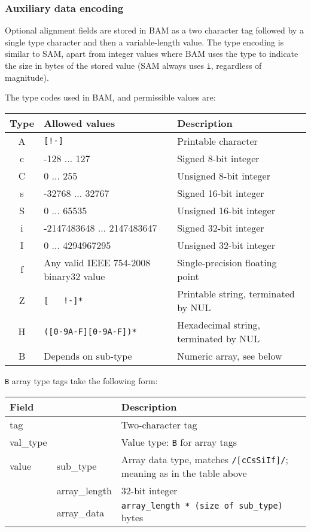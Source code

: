 \documentclass[10pt]{article}
\begin{document}
\subsubsection{Auxiliary data encoding}\label{sec:aux-type-codes}
Optional alignment fields are stored in BAM as a two character tag followed by a single type character and then a variable-length value.
The type encoding is similar to SAM, apart from integer values where BAM uses the type to indicate the size in bytes of the stored value (SAM always uses {\tt i}, regardless of magnitude).

The type codes used in BAM, and permissible values are:

\begin{table}[ht]
\centering
\begin{tabular}{|c|l|l|}
\hline
{\bf Type} & {\bf Allowed values} & {\bf Description} \\
\hline
A & {\tt [!-\char126]} & Printable character \\
c & -128 ... 127 & Signed 8-bit integer \\
C & 0 ... 255 & Unsigned 8-bit integer \\
s & -32768 ... 32767 & Signed 16-bit integer \\
S & 0 ... 65535 & Unsigned 16-bit integer \\
i & -2147483648 ... 2147483647 & Signed 32-bit integer \\
I & 0 ... 4294967295 & Unsigned 32-bit integer \\
f & Any valid IEEE 754-2008 binary32 value & Single-precision floating point \\
Z & {\tt [\,\,\,!-\char126]*} & Printable string, terminated by NUL \\
H & {\tt ([0-9A-F][0-9A-F])*} & Hexadecimal string, terminated by NUL \\
B & Depends on sub-type & Numeric array, see below \\
\hline
\end{tabular}
\end{table}

{\tt B} array type tags take the following form:

\begin{table}[ht]
\centering
\begin{tabular}{|ll|l|}
\hline
{\bf Field} & & {\bf Description} \\
\hline
tag & & Two-character tag \\
\hline
{val\_type} & & Value type: {\tt B} for array tags \\
\hline
value & \multicolumn{1}{|l|}{sub\_type} & Array data type, matches {\tt /\char94[cCsSiIf]/}; meaning as in the table above \\\cline{2-3}
 & \multicolumn{1}{|l|}{array\_length} & 32-bit integer \\\cline{2-3}
 & \multicolumn{1}{|l|}{array\_data} & {\tt array\_length * (size of sub\_type)} bytes \\
\hline
\end{tabular}
\end{table}
\end{document}

